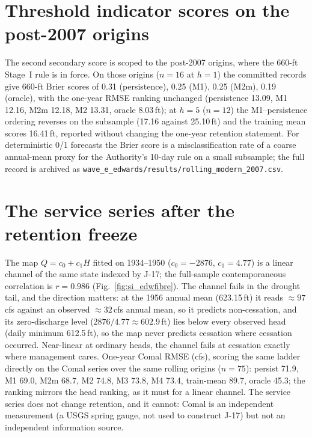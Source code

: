 \section{Threshold indicator scores on the post-2007 origins}\label{si:edwbrier}

The second secondary score is scoped to the post-2007 origins, where the 660-ft Stage~I rule is in force. On those origins ($n=16$ at $h=1$) the committed records give 660-ft Brier scores of 0.31 (persistence), 0.25 (M1), 0.25 (M2m), 0.19 (oracle), with the one-year RMSE ranking unchanged (persistence 13.09, M1 12.16, M2m 12.18, M2 13.31, oracle 8.03\,ft); at $h=5$ ($n=12$) the M1--persistence ordering reverses on the subsample (17.16 against 25.10\,ft) and the training mean scores 16.41\,ft, reported without changing the one-year retention statement. For deterministic 0/1 forecasts the Brier score is a misclassification rate of a coarse annual-mean proxy for the Authority's 10-day rule on a small subsample; the full record is archived as \texttt{wave\_e\_edwards/results/rolling\_modern\_2007.csv}.

\FloatBarrier
\section{The service series after the retention freeze}\label{si:edwcomal}

The map $Q=c_0+c_1H$ fitted on 1934--1950 ($c_0=-2876$, $c_1=4.77$) is a linear channel of the same state indexed by J-17; the full-sample contemporaneous correlation is $r=0.986$ (Fig.~\ref{fig:si_edwfibre}). The channel fails in the drought tail, and the direction matters: at the 1956 annual mean (623.15\,ft) it reads $\approx97$\,cfs against an observed $\approx32$\,cfs annual mean, so it predicts non-cessation, and its zero-discharge level ($2876/4.77\approx602.9$\,ft) lies below every observed head (daily minimum 612.5\,ft), so the map never predicts cessation where cessation occurred. Near-linear at ordinary heads, the channel fails at cessation exactly where management cares. One-year Comal RMSE (cfs), scoring the same ladder directly on the Comal series over the same rolling origins ($n=75$): persist 71.9, M1 69.0, M2m 68.7, M2 74.8, M3 73.8, M4 73.4, train-mean 89.7, oracle 45.3; the ranking mirrors the head ranking, as it must for a linear channel. The service series does not change retention, and it cannot: Comal is an independent measurement (a USGS spring gauge, not used to construct J-17) but not an independent information source.

